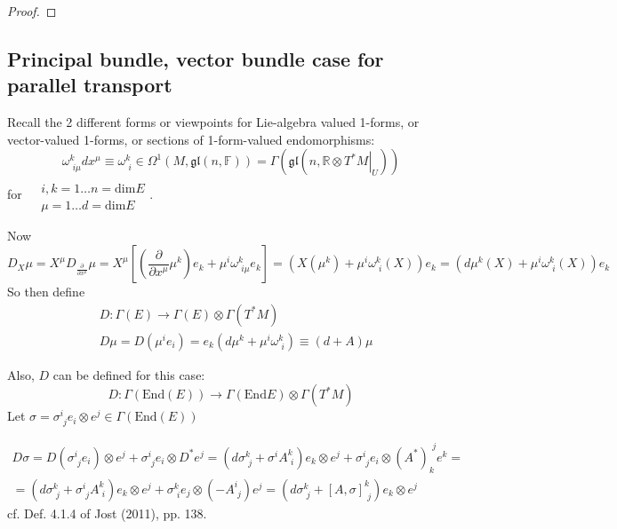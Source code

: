 \documentclass[10pt]{amsart}
\begin{document}
\begin{multicols*}{2}
\begin{proof}
\end{proof}




\subsection{Principal bundle, vector bundle case for parallel transport}  

Recall the 2 different forms or viewpoints for Lie-algebra valued 1-forms, or vector-valued 1-forms, or sections of 1-form-valued endomorphisms:
\[
\omega^k_{ \,\, i\mu} dx^{\mu} \equiv \omega^k_{\,\,i} \in \Omega^1(M,\mathfrak{gl}(n,\mathbb{F})) = \Gamma(\mathfrak{gl}(n,\mathbb{R} \otimes \left. T^* M \right|_U ) )
\] 
for $\begin{aligned} & \quad \\
	& i,k = 1\dots n =\text{dim}E \\ 
	& \mu = 1\dots d =\text{dim}E \end{aligned}$.  

Now
\[
D_X\mu = X^{\mu} D_{\frac{\partial }{ \partial x^{\mu}}}\mu = X^{\mu} \left[ \left( \frac{ \partial }{ \partial x^{\mu}} \mu^k \right) e_k + \mu^i \omega^k_{ \,\, i\mu} e_k \right] = \left( X(\mu^k) + \mu^i \omega^k_{ \,\, i}(X) \right) e_k = \left( d\mu^k(X) + \mu^i \omega^k_{ \,\, i}(X) \right) e_k
\]
So then define 
\begin{equation}
	\begin{aligned}
		& D: \Gamma(E) \to \Gamma(E) \otimes \Gamma(T^*M) \\
	& D\mu  = D(\mu^i e_i) = e_k ( d\mu^k +\mu^i \omega^k_{ \,\, i}) \equiv (d+A)\mu
	\end{aligned}
\end{equation}

Also, $D$ can be defined for this case:
\[
D: \Gamma (\text{End}(E)) \to \Gamma(\text{End}E) \otimes \Gamma(T^*M)
\]
Let $\sigma = \sigma^i_{ \,\, j} e_i \otimes e^j \in \Gamma(\text{End}(E))$

\begin{equation}
\begin{gathered}
	D\sigma = D(\sigma^i_{ \,\, j} e_i ) \otimes e^j + \sigma^i_{ \,\, j} e_i \otimes D^* e^j = \left( d\sigma^k_{ \,\, j} + \sigma^i A^k_{ \,\, i} \right) e_k \otimes e^j + \sigma^i_{ \,\, j} e_i \otimes (A^*)_k^{ \,\, j} e^k = \\
	= (d\sigma^k_{ \,\, j} + \sigma^i_{ \,\, j} A^k_{ \,\, i} ) e_k \otimes e^j + \sigma^k_{ \,\, i} e_j \otimes (- A^i_{ \, \, j}) e^j = (d\sigma^k_{ \,\, j} + [A,\sigma]^k_{ \,\, j}) e_k\otimes e^j
\end{gathered}
\end{equation}
cf. Def. 4.1.4 of Jost (2011), pp. 138.  


\end{multicols*}
\end{document}
